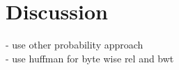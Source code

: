 
\chapter{Discussion}
\label{ch:Discussion}


- use other probability approach\\
- use huffman for byte wise rel and bwt\\

